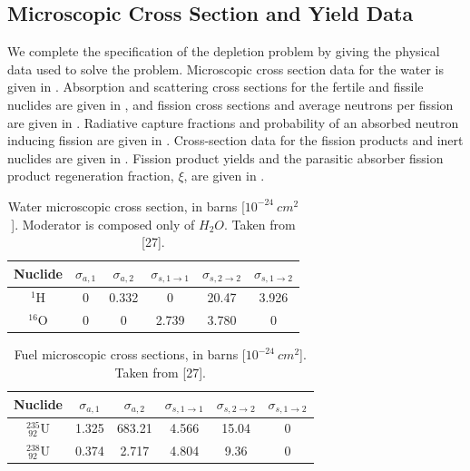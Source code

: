 \subsection{Microscopic Cross Section and Yield Data}

We complete the specification of the depletion problem  by giving the physical data used to solve the problem.  
Microscopic cross section data for the water is given in .  
Absorption and scattering cross sections for the fertile and fissile nuclides are given in ,  
and fission cross sections and average neutrons per fission are given in .  
Radiative capture fractions and probability of an absorbed neutron inducing fission are given in .   
Cross-section data for the fission products and inert nuclides are given in .
Fission product yields and the parasitic absorber fission product regeneration fraction, $\xi$, are given in .
\begin{table}[!htp]
\centering
\caption{Water microscopic cross section, in barns [$10^{-24}~cm^2$].  Moderator is composed only of $H_{2} O$.  Taken from [27].}
\begin{tabular}{|c|c|c|c|c|c|}
\hline
Nuclide &		$\sigma_{a,1}$ & $\sigma_{a,2} $& $\sigma_{s,1\to1} $& $\sigma_{s,2\to2}$ & $\sigma_{s,1\to2}$ \\
\hline
$^1\text{H}$   & 0  &  0.332 & 0 & 20.47 & 3.926 \\
\hline
$^{16}\text{O}$&  0 & 0 &  2.739 & 3.780 & 0 \\
\hline
\end{tabular}	
\label{tbl:water}
\end{table}
%
%
\begin{table}[!htp]
\centering
\caption{Fuel microscopic cross sections, in barns [$10^{-24}~cm^2$].  Taken from [27].}
\begin{tabular}{|c|c|c|c|c|c|}
\hline
Nuclide &		$\sigma_{a,1}$ & $\sigma_{a,2} $& $\sigma_{s,1\to1} $& $\sigma_{s,2\to2}$ & $\sigma_{s,1\to2}$ \\
\hline
$^{235} _{~92} \text{U}$   & 1.325 &  683.21 & 4.566 & 15.04 & 0\\
\hline
$^{238} _{~92} \text{U}$   & 0.374 &  2.717 & 4.804 & 9.36 & 0 \\
\hline
\end{tabular}	
\label{tbl:fresh-fuel}
\end{table}
